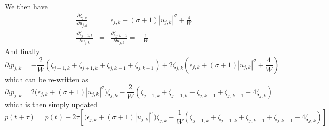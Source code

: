 \documentclass[12pt, a4paper, prl]{revtex4}
\newcommand{\abs}[1]{\left| #1 \right|}
\begin{document}
We then have
\begin{eqnarray*}
\frac{\partial\zeta_{j,k}}{\partial u_{j,k}} &=& \epsilon_{j,k}  + \left(\sigma +1\right) \abs{u_{j,k}}^\sigma + \frac{4}{W} \\
\frac{\partial\zeta_{j\pm 1,k}}{\partial u_{j,k}} &=&
\frac{\partial\zeta_{j,k\pm 1}}{\partial u_{j,k}} = -\frac{1}{W} 
\end{eqnarray*}
And finally
\begin{equation*}
 \partial_t p_{j,k} =
 - \frac{2}{W} \left( \zeta_{j-1,k} + \zeta_{j+1,k} + \zeta_{j,k-1} + \zeta_{j,k+1} \right)
+
 2 \zeta_{j,k} \left( \epsilon_{j,k}  + \left(\sigma +1\right) \abs{u_{j,k}}^\sigma + \frac{4}{W} \right)
\end{equation*}
which can be re-written as
\begin{equation*}
 \partial_t p_{j,k} =
  2 \Big(\epsilon_{j,k}  + \left(\sigma +1\right) \abs{u_{j,k}}^\sigma \Big) \zeta_{j,k} 
 - \frac{2}{W} \left( \zeta_{j-1,k} + \zeta_{j+1,k} + \zeta_{j,k-1} + \zeta_{j,k+1} - 4 \zeta_{j,k} \right)
\end{equation*}
which is then simply updated 
\begin{equation*}
p(t+\tau) = p(t) + 2\tau \left[  \Big(\epsilon_{j,k}  + \left(\sigma +1\right) \abs{u_{j,k}}^\sigma \Big) \zeta_{j,k} 
 - \frac{1}{W}\left( \zeta_{j-1,k} + \zeta_{j+1,k} + \zeta_{j,k-1} + \zeta_{j,k+1} - 4 \zeta_{j,k} \right)\right]
\end{equation*}


\begin{thebibliography}{99}
\end{thebibliography}
\end{document}
